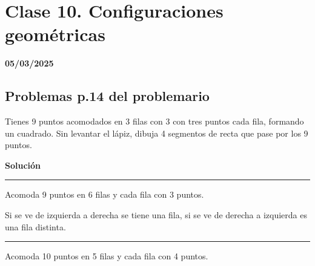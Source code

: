 \section{Clase 10. Configuraciones geométricas}
\textbf{05/03/2025}

\subsection{Problemas p.14 del problemario}


\begin{minipage}[t]{0.48\textwidth}
    \noindent
    \begin{excercise}
        Tienes 9 puntos acomodados en 3 filas con 3 con tres puntos cada fila, formando un cuadrado. Sin levantar el lápiz, dibuja 4 segmentos de recta que pase por los 9 puntos.
    \end{excercise}
\end{minipage}
\begin{minipage}[t]{0.48\textwidth}
    \begin{center}
        \textbf{Solución}
    \end{center}
    \begin{center}
        
    \end{center}
\end{minipage}
\par

\bigskip
\noindent\hrule
\bigskip

\par
\begin{minipage}[t]{0.48\textwidth}
    \bigskip \bigskip
    \begin{excercise}
        Acomoda 9 puntos en 6 filas y cada fila con 3 puntos.
    \end{excercise}
\end{minipage}
\begin{minipage}[t]{0.48\textwidth}
    \noindent
    \begin{center}
        
    \end{center}
    Si se ve de izquierda a derecha se tiene una fila, si se ve de derecha a izquierda es una fila distinta.
\end{minipage}
\par

\bigskip
\noindent\hrule
\bigskip

\par
\begin{minipage}[t]{0.48\textwidth}
    \begin{excercise}
        Acomoda 10 puntos en 5 filas y cada fila con 4 puntos.
    \end{excercise}
\end{minipage}
\begin{minipage}[t]{0.48\textwidth}
    \noindent
    \begin{center}
        
    \end{center}
\end{minipage}
